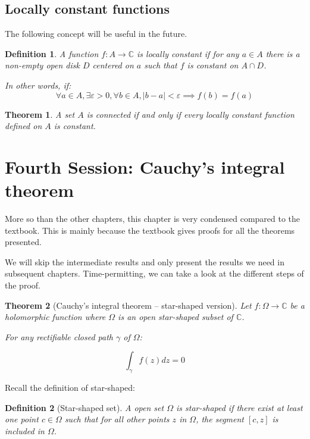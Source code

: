\documentclass{article}
\newtheorem*{defi}{Definition}
\newtheorem*{thm*}{Theorem}
\begin{document}
\subsection{Locally constant functions}
The following concept will be useful in the future.

\begin{defi}
    A function $f: A \rightarrow \mathbb{C}$ is locally constant if for any $a\in A$ there is a non-empty open disk $D$ centered on $a$ such that $f$ is constant on $A\cap D$.

    In other words, if:
    $$ \forall a \in A, \exists \varepsilon >0, \forall b \in A, |b-a|< \varepsilon \implies f(b) = f(a) $$
\end{defi}

\begin{thm*}
    A set $A$ is connected if and only if every locally constant function defined on $A$ is constant.
\end{thm*}

\newpage
\section{Fourth Session: Cauchy's integral theorem}
More so than the other chapters, this chapter is very condensed compared to the textbook. This is mainly because the textbook gives proofs for all the theorems presented.

We will skip the intermediate results and only present the results we need in subsequent chapters. Time-permitting, we can take a look at the different steps of the proof.

\begin{thm*}[Cauchy's integral theorem -- star-shaped version]
    Let $f: \Omega \rightarrow \mathbb{C}$ be a holomorphic function where $\Omega$ is an open star-shaped subset of $\mathbb{C}$.

    For any rectifiable closed path $\gamma$ of $\Omega$:

    $$ \int_\gamma f(z)dz = 0 $$
\end{thm*}

Recall the definition of star-shaped:

\begin{defi}[Star-shaped set]
    A open set $\Omega$ is star-shaped if there exist at least one point $c\in\Omega$ such that for all other points $z$ in $\Omega$, the segment $[c, z]$ is included in $\Omega$.
\end{defi}
\end{document}
